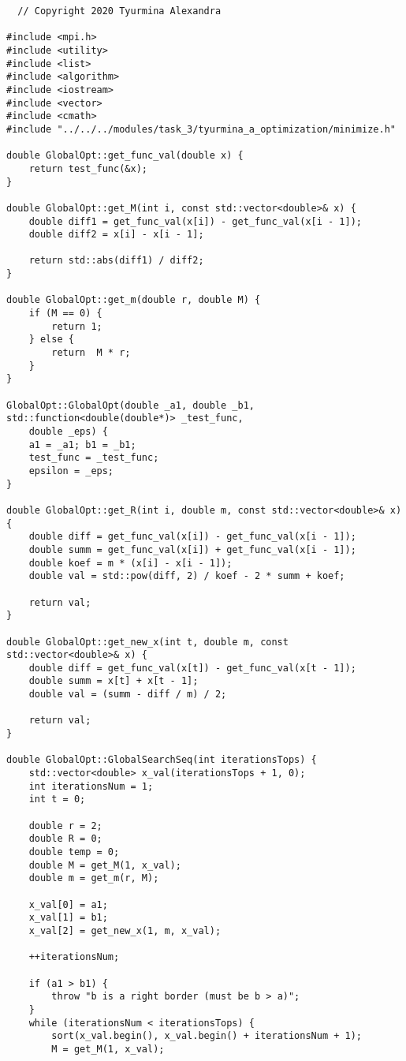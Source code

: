 \documentclass[a4paper]{report}
\begin{document}
\begin{lstlisting}
  // Copyright 2020 Tyurmina Alexandra

#include <mpi.h>
#include <utility>
#include <list>
#include <algorithm>
#include <iostream>
#include <vector>
#include <cmath>
#include "../../../modules/task_3/tyurmina_a_optimization/minimize.h"

double GlobalOpt::get_func_val(double x) {
    return test_func(&x);
}

double GlobalOpt::get_M(int i, const std::vector<double>& x) {
    double diff1 = get_func_val(x[i]) - get_func_val(x[i - 1]);
    double diff2 = x[i] - x[i - 1];

    return std::abs(diff1) / diff2;
}

double GlobalOpt::get_m(double r, double M) {
    if (M == 0) {
        return 1;
    } else {
        return  M * r;
    }
}

GlobalOpt::GlobalOpt(double _a1, double _b1, std::function<double(double*)> _test_func,
    double _eps) {
    a1 = _a1; b1 = _b1;
    test_func = _test_func;
    epsilon = _eps;
}

double GlobalOpt::get_R(int i, double m, const std::vector<double>& x) {
    double diff = get_func_val(x[i]) - get_func_val(x[i - 1]);
    double summ = get_func_val(x[i]) + get_func_val(x[i - 1]);
    double koef = m * (x[i] - x[i - 1]);
    double val = std::pow(diff, 2) / koef - 2 * summ + koef;

    return val;
}

double GlobalOpt::get_new_x(int t, double m, const std::vector<double>& x) {
    double diff = get_func_val(x[t]) - get_func_val(x[t - 1]);
    double summ = x[t] + x[t - 1];
    double val = (summ - diff / m) / 2;

    return val;
}

double GlobalOpt::GlobalSearchSeq(int iterationsTops) {
    std::vector<double> x_val(iterationsTops + 1, 0);
    int iterationsNum = 1;
    int t = 0;

    double r = 2;
    double R = 0;
    double temp = 0;
    double M = get_M(1, x_val);
    double m = get_m(r, M);

    x_val[0] = a1;
    x_val[1] = b1;
    x_val[2] = get_new_x(1, m, x_val);

    ++iterationsNum;

    if (a1 > b1) {
        throw "b is a right border (must be b > a)";
    }
    while (iterationsNum < iterationsTops) {
        sort(x_val.begin(), x_val.begin() + iterationsNum + 1);
        M = get_M(1, x_val);


\end{lstlisting}
\end{document}
